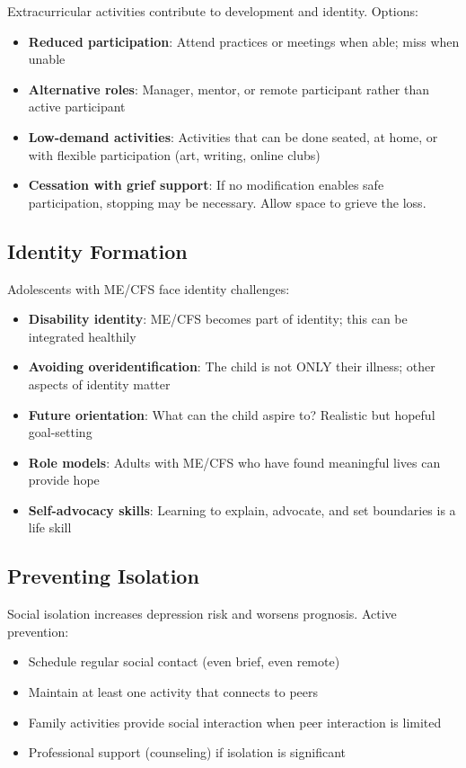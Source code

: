 Extracurricular activities contribute to development and identity. Options:

\begin{itemize}
    \item \textbf{Reduced participation}: Attend practices or meetings when able; miss when unable
    \item \textbf{Alternative roles}: Manager, mentor, or remote participant rather than active participant
    \item \textbf{Low-demand activities}: Activities that can be done seated, at home, or with flexible participation (art, writing, online clubs)
    \item \textbf{Cessation with grief support}: If no modification enables safe participation, stopping may be necessary. Allow space to grieve the loss.
\end{itemize}

\subsection{Identity Formation}

Adolescents with ME/CFS face identity challenges:

\begin{itemize}
    \item \textbf{Disability identity}: ME/CFS becomes part of identity; this can be integrated healthily
    \item \textbf{Avoiding overidentification}: The child is not ONLY their illness; other aspects of identity matter
    \item \textbf{Future orientation}: What can the child aspire to? Realistic but hopeful goal-setting
    \item \textbf{Role models}: Adults with ME/CFS who have found meaningful lives can provide hope
    \item \textbf{Self-advocacy skills}: Learning to explain, advocate, and set boundaries is a life skill
\end{itemize}

\subsection{Preventing Isolation}

Social isolation increases depression risk and worsens prognosis. Active prevention:

\begin{itemize}
    \item Schedule regular social contact (even brief, even remote)
    \item Maintain at least one activity that connects to peers
    \item Family activities provide social interaction when peer interaction is limited
    \item Professional support (counseling) if isolation is significant
\end{itemize}

